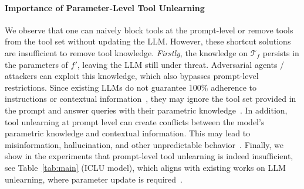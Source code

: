 \paragraph{Importance of Parameter-Level Tool Unlearning}
We observe that one can naively block tools at the prompt-level or remove tools from the tool set without updating the LLM. However, these shortcut solutions are insufficient to remove tool knowledge. 
\emph{Firstly}, the knowledge on $\mathcal{T}_f$ persists in the parameters of $f'$, leaving the LLM still under threat. Adversarial agents / attackers can exploit this knowledge, which also bypasses prompt-level restrictions. Since existing LLMs do not guarantee 100\% adherence to instructions or contextual information~\citep{zhou2023instruction,zeng2024evaluating}, they may ignore the tool set provided in the prompt and answer queries with their parametric knowledge~\citep{goyal-etal-2023-factual}. 
In addition, tool unlearning at prompt level can create conflicts between the model's parametric knowledge and contextual information. This may lead to misinformation, hallucination, and other unpredictable behavior~\citep{xu2024knowledge}. Finally, we show in the experiments that prompt-level tool unlearning is indeed insufficient, see Table~\ref{tab:main} (ICLU model), which aligns with existing works on LLM unlearning, where parameter update is required~\citep{jia-etal-2024-soul,zhang2024negative}.




